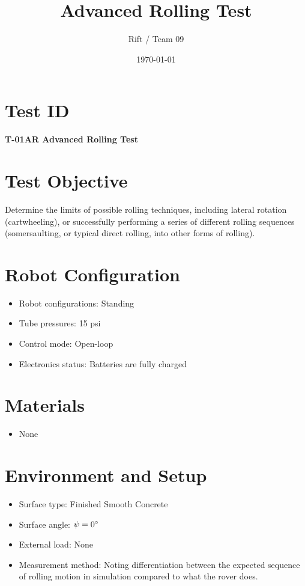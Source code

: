 \documentclass[11pt]{article}
\title{Advanced Rolling Test}
\author{Rift / Team 09}
\date{\today}
\begin{document}
\maketitle

\section*{Test ID}
\textbf{T-01AR Advanced Rolling Test} 

\section*{Test Objective}
Determine the limits of possible rolling techniques, including lateral rotation (cartwheeling), or successfully performing a series of different rolling sequences (somersaulting, or typical direct rolling, into other forms of rolling).

\section*{Robot Configuration}
\begin{itemize}[noitemsep]
    \item Robot configurations: Standing
    \item Tube pressures: 15 psi
    \item Control mode: Open-loop
    \item Electronics status: Batteries are fully charged
\end{itemize}

\section*{Materials}
\begin{itemize}[noitemsep]
    \item None
    
\end{itemize}

\section*{Environment and Setup}
\begin{itemize}[noitemsep]
    \item Surface type: Finished Smooth Concrete
    \item Surface angle: $\psi = 0 {\degree}$ 
    \item External load: None 
    \item Measurement method: Noting differentiation between the expected sequence of rolling motion in simulation compared to what the rover does.
\end{itemize}
\end{document}
